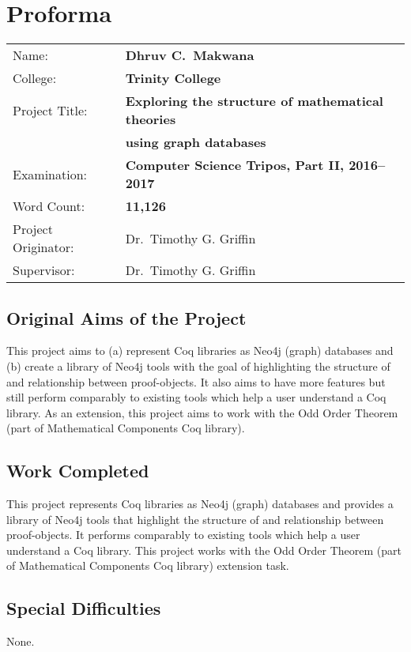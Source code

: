 \chapter*{Proforma}

{%
\begin{tabular}{ll}
Name:               & \bf Dhruv C.\ Makwana \\
College:            & \bf Trinity College                     \\
Project Title:      & \bf Exploring the structure of mathematical theories \\
                    & \bf using graph databases \\
Examination:        & \bf Computer Science Tripos, Part II, 2016--2017 \\
Word Count:         & \bf 11,126 \\
Project Originator: & Dr.\ Timothy G. Griffin \\
Supervisor:         & Dr.\ Timothy G. Griffin \\
\end{tabular}
}

\section*{Original Aims of the Project}

This project aims to (a) represent Coq libraries as Neo4j (graph) databases and
(b) create a library of Neo4j tools with the goal of highlighting the structure
of and relationship between proof-objects.  It also aims to have more features
but still perform comparably to existing tools which help a user understand a
Coq library. As an extension, this project aims to work with the Odd Order
Theorem (part of Mathematical Components Coq library).

\section*{Work Completed}

This project represents Coq libraries as Neo4j (graph) databases and provides a
library of Neo4j tools that highlight the structure of and relationship between
proof-objects. It performs comparably to existing tools which help a user
understand a Coq library. This project works with the Odd Order Theorem (part
of Mathematical Components Coq library) extension task.

\section*{Special Difficulties}
None.

